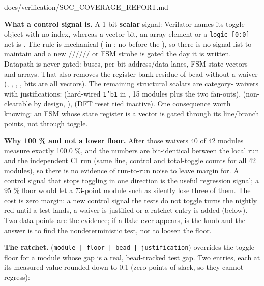 \begin{relocated}{docs/verification/SOC_COVERAGE_REPORT.md}
{}

\textbf{What a control signal is.} A 1-bit \textbf{scalar} signal:
Verilator names its toggle object  with no \code{[bit]}
index, whereas a vector bit, an array element or a
\texttt{logic\ [0:\allowbreak{}0]} net is . The rule
is mechanical ( in :
no \code{[} before the \code{:}), so there is no signal list to maintain
and a new
//////
or FSM strobe is gated the day it is written. Datapath is never gated:
buses, per-bit address/\allowbreak{}data lanes, FSM state vectors and
arrays. That also removes the register-bank residue of bead 
without a waiver (, , ,
,  bits are all vectors). The remaining
structural scalars are category- waivers with justifications:
 (hard-wired \texttt{1'b1} in
, 15 modules plus the two 
fan-outs),  (non-clearable by design, ),
 (DFT reset tied inactive). One consequence worth
knowing: an FSM whose state register is a vector is gated through its
line/\allowbreak{}branch points, not through toggle.

\textbf{Why 100 \% and not a lower floor.} After those waivers 40 of 42
modules measure exactly 100.0 \%, and the numbers are bit-identical
between the local run and the independent CI run 
(same line, control and total-toggle counts for all 42 modules), so
there is no evidence of run-to-run noise to leave margin for. A control
signal that stops toggling in one direction is the useful regression
signal; a 95 \% floor would let a 73-point module such as
 silently lose three of them. The cost is zero
margin: a new control signal the tests do not toggle turns the nightly
red until a test lands, a waiver is justified or a ratchet entry is
added (below). Two data points are the evidence; if a flake ever
appears,  is the knob and the answer is to find the
nondeterministic test, not to loosen the floor.

\textbf{The ratchet.} 
(\texttt{module\ |\ floor\ |\ bead\ |\ justification}) overrides the
toggle floor for a module whose gap is a real, bead-tracked test gap.
Two entries, each at its measured value rounded down to 0.1 (zero points
of slack, so they cannot regress):


\end{relocated}

